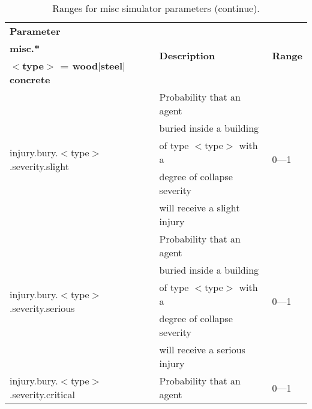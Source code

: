 \documentclass{article}
\begin{document}
\begin{table}[htb]
\caption{Ranges for misc simulator parameters (continue).}
\label{tab:12}
\centering
\begin{tabular}{lll}
  \hline
  \textbf{Parameter}                                        &
  \multirow{3}{*}{\textbf{Description}} & \multirow{3}{*}{\textbf{Range}}\\
  \textbf{misc.*}                                           &                  
                                        & \\
  \textbf{$<$type$>$ = wood$|$steel$|$concrete}             &                  
                                        & \\
  \hline
  \multirow{5}{*}{injury.bury.$<$type$>$.severity.slight}   &  Probability that
  an agent                              & \multirow{5}{*}{0---1}\\
                                                            & buried inside a
  building                              & \\
                                                            & of type $<$type$>$
  with a                                & \\
                                                            & degree of collapse
  severity                              & \\
                                                            & will receive a
  slight injury                         & \\
  \hline
  \multirow{5}{*}{injury.bury.$<$type$>$.severity.serious}  & 
  Probability that an agent             & \multirow{5}{*}{0---1}\\
                                                            & buried inside a
  building                              & \\
                                                            & of type $<$type$>$
  with a                                & \\
                                                            & degree of collapse
  severity                              & \\
                                                            & will receive a
  serious injury                        & \\
  \hline
  \multirow{5}{*}{injury.bury.$<$type$>$.severity.critical} &  Probability that
  an agent                              & \multirow{5}{*}{0---1}\\

\end{tabular}
\end{table}
\end{document}
